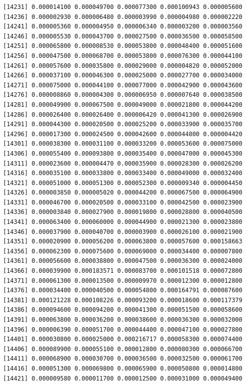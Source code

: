 \documentclass[]{article}
\begin{document}
\begin{verbatim}
[14231] 0.000014100 0.000049700 0.000077300 0.000100943 0.000005600
[14236] 0.000002930 0.000006480 0.000003990 0.000004980 0.000002220
[14241] 0.000005360 0.000004950 0.000006340 0.000003200 0.000003560
[14246] 0.000005530 0.000043700 0.000027500 0.000036500 0.000058500
[14251] 0.000065800 0.000008530 0.000053800 0.000048400 0.000051600
[14256] 0.000047500 0.000068700 0.000053800 0.000076300 0.000044100
[14261] 0.000057600 0.000035800 0.000029000 0.000004820 0.000052000
[14266] 0.000037100 0.000046300 0.000025000 0.000027700 0.000034000
[14271] 0.000075000 0.000044100 0.000077000 0.000042900 0.000043600
[14276] 0.000008860 0.000004300 0.000006950 0.000007640 0.000038500
[14281] 0.000049900 0.000067500 0.000049000 0.000021800 0.000044200
[14286] 0.000026400 0.000026400 0.000006420 0.000041300 0.000026900
[14291] 0.000044300 0.000020500 0.000025200 0.000033900 0.000035700
[14296] 0.000017300 0.000024500 0.000042600 0.000044800 0.000004420
[14301] 0.000038300 0.000031100 0.000033200 0.000053600 0.000075000
[14306] 0.000055400 0.000093800 0.000035400 0.000047000 0.000045300
[14311] 0.000023600 0.000004470 0.000035900 0.000028300 0.000026200
[14316] 0.000035100 0.000033800 0.000033400 0.000049000 0.000032400
[14321] 0.000051000 0.000051300 0.000052300 0.000009340 0.000004450
[14326] 0.000003850 0.000005020 0.000044200 0.000067500 0.000064900
[14331] 0.000046700 0.000020500 0.000033100 0.000042500 0.000023900
[14336] 0.000003840 0.000027900 0.000019800 0.000028800 0.000040500
[14341] 0.000063400 0.000060000 0.000044900 0.000021300 0.000023800
[14346] 0.000037900 0.000040700 0.000003900 0.000026100 0.000021900
[14351] 0.000020900 0.000056200 0.000063800 0.000057600 0.000158663
[14356] 0.000062300 0.000075600 0.000069000 0.000034400 0.000007800
[14361] 0.000056600 0.000038800 0.000047500 0.000036300 0.000024000
[14366] 0.000039900 0.000183571 0.000083700 0.000101518 0.000072800
[14371] 0.000061300 0.000013500 0.000009970 0.000012300 0.000012800
[14376] 0.000034400 0.000040500 0.000054800 0.000164791 0.000087600
[14381] 0.000121228 0.000108226 0.000093200 0.000018600 0.000117379
[14386] 0.000094600 0.000094200 0.000041300 0.000051500 0.000058600
[14391] 0.000063800 0.000036200 0.000038600 0.000036300 0.000032000
[14396] 0.000006390 0.000051700 0.000044400 0.000047100 0.000027800
[14401] 0.000030800 0.000025000 0.000216717 0.000058300 0.000074400
[14406] 0.000089900 0.000055100 0.000012800 0.000080300 0.000066700
[14411] 0.000068900 0.000030700 0.000036500 0.000032500 0.000061700
[14416] 0.000051300 0.000069800 0.000065900 0.000050800 0.000014800
[14421] 0.000009580 0.000011700 0.000012500 0.000031000 0.000049400

\end{verbatim}
\end{document}

